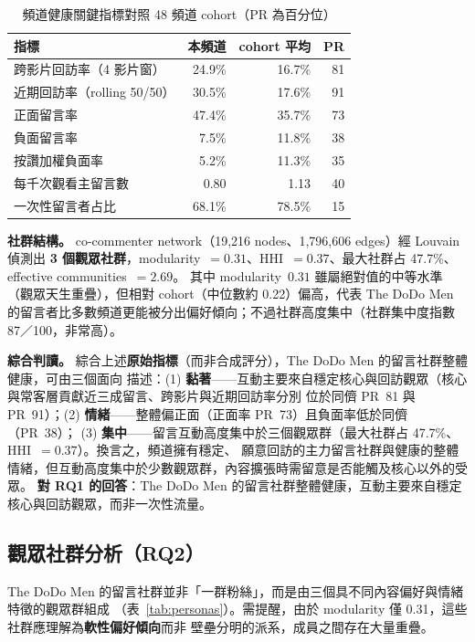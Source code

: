 \begin{table}[H]
\centering
\caption{頻道健康關鍵指標對照 48 頻道 cohort（PR 為百分位）}
\label{tab:health-bench}
\small
\begin{tabular}{lrrr}
\toprule
\textbf{指標} & \textbf{本頻道} & \textbf{cohort 平均} & \textbf{PR}\\
\midrule
跨影片回訪率（4 影片窗） & 24.9\% & 16.7\% & 81 \\
近期回訪率（rolling 50/50） & 30.5\% & 17.6\% & 91 \\
正面留言率 & 47.4\% & 35.7\% & 73 \\
負面留言率 & 7.5\% & 11.8\% & 38 \\
按讚加權負面率 & 5.2\% & 11.3\% & 35 \\
每千次觀看主留言數 & 0.80 & 1.13 & 40 \\
一次性留言者占比 & 68.1\% & 78.5\% & 15 \\
\bottomrule
\end{tabular}
\end{table}

\textbf{社群結構。} co-commenter network（19{,}216 nodes、1{,}796{,}606 edges）經 Louvain 偵測出
\textbf{3 個觀眾社群}，modularity~$=0.31$、HHI~$=0.37$、最大社群占 47.7\%、effective communities~$=2.69$。
其中 modularity~$0.31$ 雖屬絕對值的中等水準（觀眾天生重疊），但相對 cohort（中位數約 0.22）偏高，代表
The DoDo Men 的留言者比多數頻道更能被分出偏好傾向；不過社群高度集中（社群集中度指數 87／100，非常高）。

\textbf{綜合判讀。} 綜合上述\textbf{原始指標}（而非合成評分），The DoDo Men 的留言社群整體健康，可由三個面向
描述：(1) \textbf{黏著}——互動主要來自穩定核心與回訪觀眾（核心與常客層貢獻近三成留言、跨影片與近期回訪率分別
位於同儕 PR~81 與 PR~91）；(2) \textbf{情緒}——整體偏正面（正面率 PR~73）且負面率低於同儕（PR~38）；
(3) \textbf{集中}——留言互動高度集中於三個觀眾群（最大社群占 47.7\%、HHI~$=0.37$）。換言之，頻道擁有穩定、
願意回訪的主力留言社群與健康的整體情緒，但互動高度集中於少數觀眾群，內容擴張時需留意是否能觸及核心以外的受眾。
\textbf{對 RQ1 的回答}：The DoDo Men 的留言社群整體健康，互動主要來自穩定核心與回訪觀眾，而非一次性流量。

\subsection{觀眾社群分析（RQ2）}
\label{sec:case-community}

The DoDo Men 的留言社群並非「一群粉絲」，而是由三個具不同內容偏好與情緒特徵的觀眾群組成
（表~\ref{tab:personas}）。需提醒，由於 modularity 僅 0.31，這些社群應理解為\textbf{軟性偏好傾向}而非
壁壘分明的派系，成員之間存在大量重疊。

